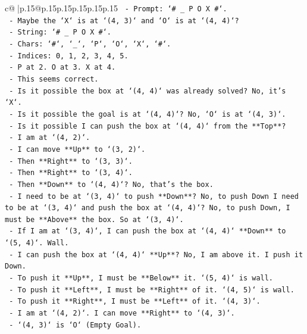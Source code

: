 \documentclass{article}
\begin{document}
{\begin{supertabular}{c@{$\;$}|p{.15\linewidth}@{}p{.15\linewidth}p{.15\linewidth}p{.15\linewidth}p{.15\linewidth}p{.15\linewidth}}
{{{\texttt{      {-} Prompt: `\# \_ P O X \#`.} \\
\texttt{      {-} Maybe the `X` is at `(4, 3)` and `O` is at `(4, 4)`?} \\
\texttt{        {-} String: `\# \_ P O X \#`.} \\
\texttt{        {-} Chars: `\#`, `\_`, `P`, `O`, `X`, `\#`.} \\
\texttt{        {-} Indices: 0, 1, 2, 3, 4, 5.} \\
\texttt{        {-} P at 2. O at 3. X at 4.} \\
\texttt{        {-} This seems correct.} \\
\texttt{      {-} Is it possible the box at `(4, 4)` was already solved? No, it's `X`.} \\
\texttt{      {-} Is it possible the goal is at `(4, 4)`? No, `O` is at `(4, 3)`.} \\
\texttt{      {-} Is it possible I can push the box at `(4, 4)` from the **Top**?} \\
\texttt{        {-} I am at `(4, 2)`.} \\
\texttt{        {-} I can move **Up** to `(3, 2)`.} \\
\texttt{        {-} Then **Right** to `(3, 3)`.} \\
\texttt{        {-} Then **Right** to `(3, 4)`.} \\
\texttt{        {-} Then **Down** to `(4, 4)`? No, that's the box.} \\
\texttt{        {-} I need to be at `(3, 4)` to push **Down**? No, to push Down I need to be at `(3, 4)` and push the box at `(4, 4)`? No, to push Down, I must be **Above** the box. So at `(3, 4)`.} \\
\texttt{        {-} If I am at `(3, 4)`, I can push the box at `(4, 4)` **Down** to `(5, 4)`. Wall.} \\
\texttt{        {-} I can push the box at `(4, 4)` **Up**? No, I am above it. I push it Down.} \\
\texttt{        {-} To push it **Up**, I must be **Below** it. `(5, 4)` is wall.} \\
\texttt{        {-} To push it **Left**, I must be **Right** of it. `(4, 5)` is wall.} \\
\texttt{        {-} To push it **Right**, I must be **Left** of it. `(4, 3)`.} \\
\texttt{        {-} I am at `(4, 2)`. I can move **Right** to `(4, 3)`.} \\
\texttt{        {-} `(4, 3)` is `O` (Empty Goal).} \\
}}}
\end{supertabular}}
\end{document}
